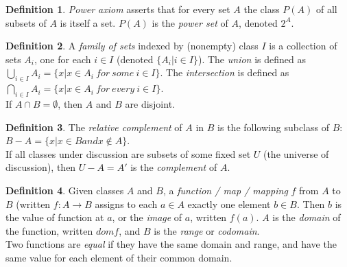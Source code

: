 \documentclass[a4paper,sfsidenotes,openany]{tufte-book}
\theoremstyle{definition}
\newtheorem{definition}{Definition}[section]
\begin{document}
\begin{fullwidth}
\begin{definition}
\textit{{\color{blue} Power axiom}} asserts that for every set $ A $ the class $ P(A) $ of all subsets of $ A $ is itself a set. $ P(A) $ is the \textit{{\color{blue} power set}} of $ A $, denoted $ 2^A $.\\
\end{definition}
\>

\begin{definition}
A \textit{{\color{blue} family of sets}} indexed by (nonempty) class $ I $ is a collection of sets $ A_i $, one for each $ i \in I $ (denoted $\{ A_i | i \in I \}$).\newline
The \textit{{\color{blue} union}} is defined as $ \bigcup\limits_{i \in I}A_{i} = \{ x | x \in A_i \ for \ some \ i \in I \}$.\newline
The \textit{{\color{blue} intersection}} is defined as $ \bigcap\limits_{i \in I}A_{i} = \{ x | x \in A_i \ for \ every \ i \in I \}$.\\
If $ A \cap B = \emptyset $, then $ A $ and $ B $ are disjoint.\\
\end{definition}
\>

\begin{definition}
The \textit{{\color{blue} relative complement}} of $ A $ in $ B $ is the following subclass of $ B $: $ B-A = \{ x | x \in B and x \notin A \}$. \\
If all classes under discussion are subsets of some fixed set $ U $ (the universe of discussion), then $ U - A = A' $ is the \textit{{\color{blue} complement}} of $ A $.\\
\end{definition}
\>

\begin{definition}
Given classes $ A $ and $ B $, a \textit{{\color{blue} function / map / mapping}} $ f $ from $ A $ to $ B $ (written $ f: A \rightarrow B $ assigns to each $ a \in A $ exactly one element $ b \in B $.\newline
Then $ b $ is the value of function at $ a $, or the \textit{{\color{blue} image}} of $ a $, written $ f(a) $.\newline
$ A $ is the \textit{{\color{blue} domain}} of the function, written $ dom f $, and $ B $ is the \textit{{\color{blue} range}} or \textit{{\color{blue} codomain}}.\\
Two functions are \textit{{\color{blue} equal}} if they have the same domain and range, and have the same value for each element of their common domain.\\
\end{definition}
\>


\end{fullwidth}
\end{document}
